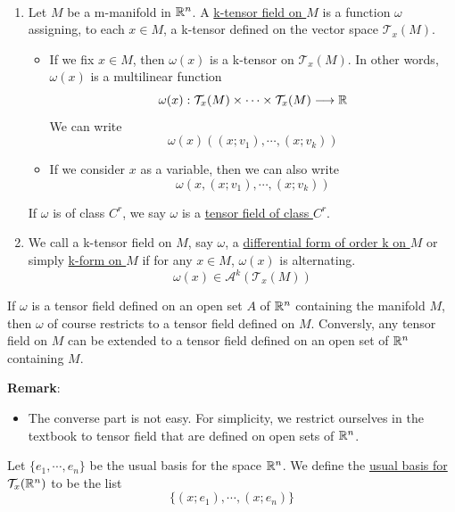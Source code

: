\begin{definition}\
    \begin{enumerate}
        \item Let $M$ be a m-manifold in $\mathbb{R}^n$. A \underline{k-tensor field on $M$} is a function $\omega$ assigning, to each $x\in M$, a k-tensor defined on the vector space $\mathcal{T}_x(M)$.
        \begin{itemize}
            \item If we fix $x\in M$, then $\omega(x)$ is a k-tensor on $\mathcal{T}_x(M)$. In other words, $\omega(x)$ is a multilinear function 
            $$\omega(x):\mathcal{T}_x(M)\times \cdots \times \mathcal{T}_x(M)\longrightarrow \mathbb{R}$$
            We can write $$\omega(x)((x;v_1),\cdots,(x;v_k))$$
            \item If we consider $x$ as a variable, then 
            we can also write $$\omega(x,(x;v_1),\cdots,(x;v_k))$$
        \end{itemize}
        If $\omega$ is of class $C^r$, we say $\omega$ is a \underline{tensor field of class $C^r$}.
        \item We call a k-tensor field on $M$, say $\omega$, a \underline{differential form of order k on $M$} or simply \underline{k-form on $M$} if for any $x\in M$, $\omega(x)$ is alternating. $$\omega(x)\in \mathcal{A}^k(\mathcal{T}_x(M))$$
    \end{enumerate}
\end{definition}

\begin{theorem*}
    If $\omega$ is a tensor field defined on an open set $A$ of $\mathbb{R}^n$ containing the manifold $M$, then $\omega$ of course restricts to a tensor field defined on $M$. Conversly, any tensor field on $M$ can be extended to a tensor field defined on an open set of $\mathbb{R}^n$ containing $M$.
\end{theorem*}
\noindent\textbf{Remark}:
\begin{itemize}
    \item The converse part is not easy. For simplicity, we restrict ourselves in the textbook to tensor field that are defined on open sets of $\mathbb{R}^n$.
\end{itemize}

\begin{definition}
    Let $\{e_1,\cdots,e_n\}$ be the usual basis for the space $\mathbb{R}^n$. We define the \underline{usual basis for $\mathcal{T}_x(\mathbb{R}^n)$} to be the list $$\{(x;e_1),\cdots,(x;e_n)\}$$
\end{definition}

